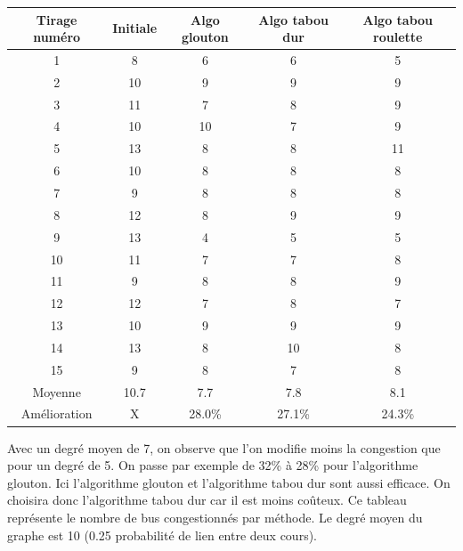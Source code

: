 \documentclass[a4paper,11pt]{article}
\begin{document}
	\begin{tabular}{|c|c|c|c|c|}
  		\hline
  		Tirage numéro & Initiale & Algo glouton & Algo tabou dur & Algo tabou roulette\\
  		\hline
  		1 & 8 & 6 & 6 & 5\\
  		\hline
  		2 & 10 & 9 & 9 & 9\\
  		\hline
  		3 & 11 & 7 & 8 & 9\\
  		\hline
  		4 & 10 & 10 & 7 & 9\\
  		\hline
  		5 & 13 & 8 & 8 & 11\\
  		\hline
  		6 & 10 & 8 & 8 & 8\\
  		\hline
  		7 & 9 & 8 & 8 & 8\\
  		\hline
  		8 & 12 & 8 & 9 & 9\\
  		\hline
  		9 & 13 & 4 & 5 & 5\\
  		\hline
  		10 & 11 & 7 & 7 & 8\\
  		\hline
  		11 & 9 & 8 & 8 & 9\\
  		\hline
  		12 & 12 & 7 & 8 & 7\\
  		\hline
  		13 & 10 & 9 & 9 & 9\\
  		\hline
  		14 & 13 & 8 & 10 & 8\\
  		\hline
  		15 & 9 & 8 & 7 & 8\\
  		\hline
  		Moyenne & 10.7 & 7.7 & 7.8 & 8.1\\
  		\hline
  		Amélioration & X & 28.0\% & 27.1\% & 24.3\%\\
  		\hline
	\end{tabular}
	Avec un degré moyen de 7, on observe que l'on modifie moins la congestion que pour un degré de 5. On passe par exemple de 32\% à 28\% pour l'algorithme glouton.
	Ici l'algorithme glouton et l'algorithme tabou dur sont aussi efficace. On choisira donc l'algorithme tabou dur car il est moins coûteux. 
	\newpage
	Ce tableau représente le nombre de bus congestionnés par méthode. Le degré moyen du graphe est 10 (0.25 probabilité de lien entre deux cours).\\ 
\end{document}
